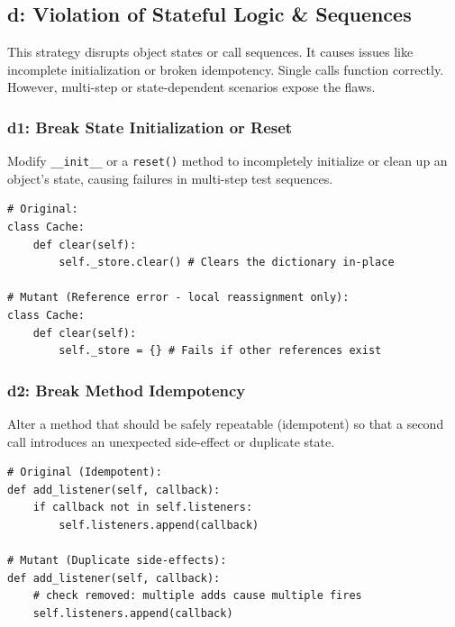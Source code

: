 \documentclass[11pt]{article}
\begin{document}
\subsection*{d: Violation of Stateful Logic \& Sequences}
This strategy disrupts object states or call sequences. It causes issues like incomplete initialization or broken idempotency. Single calls function correctly. However, multi-step or state-dependent scenarios expose the flaws.

\subsubsection*{d1: Break State Initialization or Reset}
Modify \texttt{\_\_init\_\_} or a \texttt{reset()} method to incompletely initialize or clean up an object's state, causing failures in multi-step test sequences.

\begin{listing}[H]
\begin{verbatim}
# Original:
class Cache:
    def clear(self):
        self._store.clear() # Clears the dictionary in-place

# Mutant (Reference error - local reassignment only):
class Cache:
    def clear(self):
        self._store = {} # Fails if other references exist
\end{verbatim}
\caption{d1: Improper state reset}
\label{code:d1}
\end{listing}

\subsubsection*{d2: Break Method Idempotency}
Alter a method that should be safely repeatable (idempotent) so that a second call introduces an unexpected side-effect or duplicate state.

\begin{listing}[H]
\begin{verbatim}
# Original (Idempotent):
def add_listener(self, callback):
    if callback not in self.listeners:
        self.listeners.append(callback)

# Mutant (Duplicate side-effects):
def add_listener(self, callback):
    # check removed: multiple adds cause multiple fires
    self.listeners.append(callback)
\end{verbatim}
\caption{d2: Breaking idempotency (duplicate listeners)}
\label{code:d2}
\end{listing}
\end{document}
